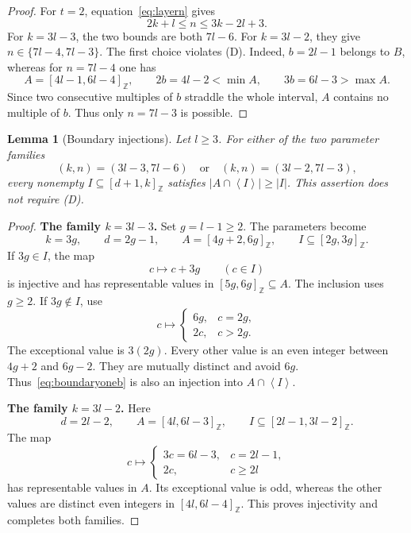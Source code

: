 \documentclass[11pt,a4paper]{article}
\numberwithin{equation}{section}
\newtheorem{lemma}[theorem]{Lemma}
\theoremstyle{remark}
\newcommand{\Z}{\mathbb Z}
\newcommand{\sg}[1]{\left\langle #1\right\rangle}
\newcommand{\Dcond}{\textup{(D)}}
\newcommand{\interval}[2]{[#1,#2]_{\Z}}
\begin{document}
\begin{proof}
For $t=2$, equation~\eqref{eq:layern} gives
\[
  2k+l\le n\le3k-2l+3.
\]
For $k=3l-3$, the two bounds are both $7l-6$.
For $k=3l-2$, they give $n\in\{7l-4,7l-3\}$.
The first choice violates \Dcond.
Indeed, $b=2l-1$ belongs to $B$, whereas for $n=7l-4$ one has
\[
  A=\interval{4l-1}{6l-4},\qquad
  2b=4l-2<\min A,\qquad 3b=6l-3>\max A.
\]
Since two consecutive multiples of $b$ straddle the whole interval,
$A$ contains no multiple of $b$.
Thus only $n=7l-3$ is possible.
\end{proof}

\begin{lemma}[Boundary injections]\label{lem:boundaryinjections}
Let $l\ge3$.
For either of the two parameter families
\[
  (k,n)=(3l-3,7l-6)
  \quad\text{or}\quad
  (k,n)=(3l-2,7l-3),
\]
every nonempty $I\subseteq\interval{d+1}{k}$ satisfies
$|A\cap\sg{I}|\ge|I|$.
This assertion does not require \Dcond.
\end{lemma}

\begin{proof}
\textbf{The family $k=3l-3$.}
Set $g=l-1\ge2$.
The parameters become
\[
  k=3g,\qquad d=2g-1,\qquad
  A=\interval{4g+2}{6g},\qquad
  I\subseteq\interval{2g}{3g}.
\]
If $3g\in I$, the map
\begin{equation}\label{eq:boundaryonea}
  c\longmapsto c+3g\qquad(c\in I)
\end{equation}
is injective and has representable values in
$\interval{5g}{6g}\subseteq A$.
The inclusion uses $g\ge2$.
If $3g\notin I$, use
\begin{equation}\label{eq:boundaryoneb}
  c\longmapsto
  \begin{cases}
    6g,&c=2g,\\
    2c,&c>2g.
  \end{cases}
\end{equation}
The exceptional value is $3(2g)$.
Every other value is an even integer between $4g+2$ and $6g-2$.
They are mutually distinct and avoid $6g$.
Thus~\eqref{eq:boundaryoneb} is also an injection into $A\cap\sg{I}$.

\textbf{The family $k=3l-2$.}
Here
\[
  d=2l-2,\qquad
  A=\interval{4l}{6l-3},\qquad
  I\subseteq\interval{2l-1}{3l-2}.
\]
The map
\begin{equation}\label{eq:boundarytwo}
  c\longmapsto
  \begin{cases}
    3c=6l-3,&c=2l-1,\\
    2c,&c\ge2l
  \end{cases}
\end{equation}
has representable values in $A$.
Its exceptional value is odd, whereas the other values are distinct
even integers in $\interval{4l}{6l-4}$.
This proves injectivity and completes both families.
\end{proof}
\end{document}

